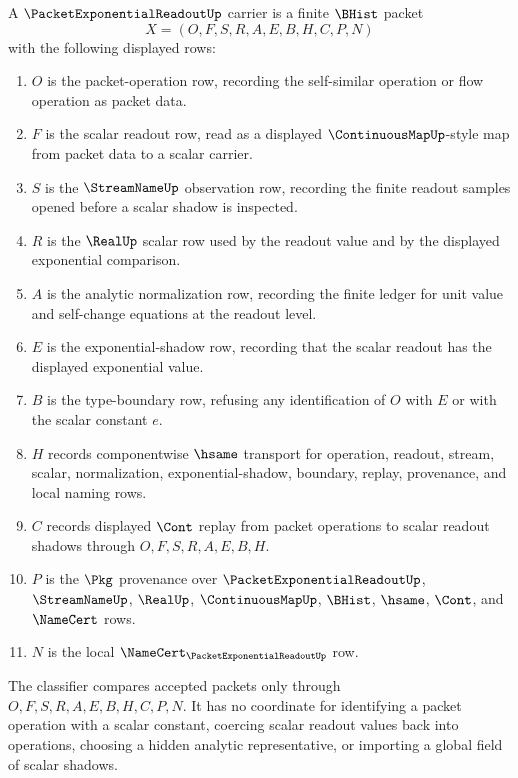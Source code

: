 \begin{definition}
\label{def:packet-exponential-readout-carrier}
A $\PacketExponentialReadoutUp$ carrier is a finite $\BHist$ packet
$$
X=(O,F,S,R,A,E,B,H,C,P,N)
$$
with the following displayed rows:
\begin{enumerate}
\item $O$ is the packet-operation row, recording the self-similar operation or flow operation as packet data.
\item $F$ is the scalar readout row, read as a displayed $\ContinuousMapUp$-style map from packet data to a scalar carrier.
\item $S$ is the $\StreamNameUp$ observation row, recording the finite readout samples opened before a scalar shadow is inspected.
\item $R$ is the $\RealUp$ scalar row used by the readout value and by the displayed exponential comparison.
\item $A$ is the analytic normalization row, recording the finite ledger for unit value and self-change equations at the readout level.
\item $E$ is the exponential-shadow row, recording that the scalar readout has the displayed exponential value.
\item $B$ is the type-boundary row, refusing any identification of $O$ with $E$ or with the scalar constant $e$.
\item $H$ records componentwise $\hsame$ transport for operation, readout, stream, scalar, normalization, exponential-shadow, boundary, replay, provenance, and local naming rows.
\item $C$ records displayed $\Cont$ replay from packet operations to scalar readout shadows through $O,F,S,R,A,E,B,H$.
\item $P$ is the $\Pkg$ provenance over $\PacketExponentialReadoutUp$, $\StreamNameUp$, $\RealUp$, $\ContinuousMapUp$, $\BHist$, $\hsame$, $\Cont$, and $\NameCert$ rows.
\item $N$ is the local $\NameCert_{\PacketExponentialReadoutUp}$ row.
\end{enumerate}
The classifier compares accepted packets only through $O,F,S,R,A,E,B,H,C,P,N$. It has no coordinate for identifying a packet operation with a scalar constant, coercing scalar readout values back into operations, choosing a hidden analytic representative, or importing a global field of scalar shadows.
\end{definition}

